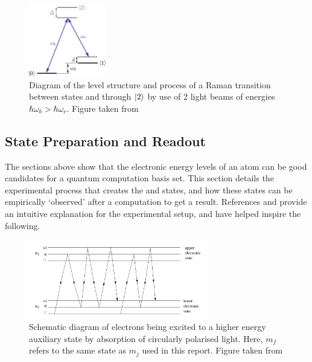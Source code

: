 \begin{figure}[H]
    \centering
    \includegraphics[width=0.3\textwidth]{images/TIQC_raman.jpg}
    \caption{Diagram of the level structure and process of a Raman transition between states \kz and \ko through $\ket{2}$ by use of 2 light beams of energies $\hbar \omega_b > \hbar \omega_r$. Figure taken from \cite{schaferFastGatesMixedSpecies2020}}\label{fig:TIQC_raman}
\end{figure}

\subsection{State Preparation and Readout}\label{sec:trappedreadout}


The sections above show that the electronic energy levels of an atom can be good candidates for a quantum computation basis set. This section details the experimental process that creates the \kz and \ko states, and how these states can be empirically `observed' after a computation to get a result. References \cite{jonhui} and \cite{pennylanetiqc} provide an intuitive explanation for the experimental setup, and have helped inspire the following.

\begin{figure}[H]
    \centering
    \includegraphics[width=0.7\textwidth]{images/States.png}
    \caption{Schematic diagram of electrons being excited to a higher energy auxiliary state by absorption of circularly polarised light. Here, $m_f$ refers to the same state as $m_j$ used in this report. Figure taken from \cite{JLExp11}}\label{fig:States}
\end{figure}

